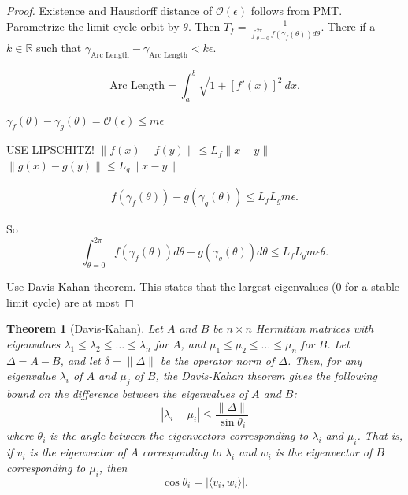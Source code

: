 \documentclass{article}
\newtheorem{theorem}{Theorem}
\theoremstyle{definition}
\theoremstyle{remark}
\newcommand{\reals}{\mathbb{R}}
\newcounter{ct}
\begin{document}
\begin{proof}
Existence and Hausdorff distance of $\mathcal{O}(\epsilon)$ follows from PMT.
Parametrize the limit cycle orbit by $\theta$.
Then $T_f = \frac{1}{\int_{\theta=0}^{2\pi}f(\gamma_f(\theta))d\theta}$.
There if a $k\in\reals$ such that $\gamma_{\text{Arc Length}} - \gamma_{\text{Arc Length}}<k\epsilon$.

\[\text{Arc Length} = \int_a^b \sqrt{1 + [f'(x)]^2} \, dx.\]

$\gamma_f(\theta)-\gamma_g(\theta) = \mathcal{O}(\epsilon) \leq m\epsilon$ %


USE LIPSCHITZ! 
$\|f(x)-f(y)\|\leq L_f\|x-y\|$
$\|g(x)-g(y)\|\leq L_g\|x-y\|$


\begin{align}
f(\gamma_f(\theta)) - g(\gamma_g(\theta)) \leq  L_fL_gm\epsilon.
\end{align}

So \[\int_{\theta=0}^{2\pi}f(\gamma_f(\theta))d\theta-g(\gamma_g(\theta))d\theta\leq L_fL_gm\epsilon\theta.\]


Use Davis-Kahan theorem. 
This states that the largest eigenvalues (0 for a stable limit cycle) are at most 
\end{proof}


\begin{theorem}[Davis-Kahan]
Let \( A \) and \( B \) be \( n \times n \) Hermitian matrices with eigenvalues \( \lambda_1 \leq \lambda_2 \leq \dots \leq \lambda_n \) for \( A \), and \( \mu_1 \leq \mu_2 \leq \dots \leq \mu_n \) for \( B \). Let \( \Delta = A - B \), and let \( \delta = \| \Delta \| \) be the operator norm of \( \Delta \). Then, for any eigenvalue \( \lambda_i \) of \( A \) and \( \mu_j \) of \( B \), the Davis-Kahan theorem gives the following bound on the difference between the eigenvalues of \( A \) and \( B \):
\[
|\lambda_i - \mu_i| \leq \frac{\| \Delta \|}{\sin \theta_i}
\]
where \( \theta_i \) is the angle between the eigenvectors corresponding to \( \lambda_i \) and \( \mu_i \). That is, if \( v_i \) is the eigenvector of \( A \) corresponding to \( \lambda_i \) and \( w_i \) is the eigenvector of \( B \) corresponding to \( \mu_i \), then
\[
\cos \theta_i = | \langle v_i, w_i \rangle |.
\]
\end{theorem}
\end{document}
